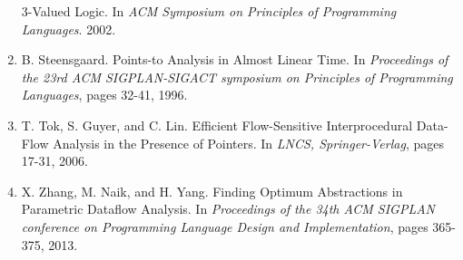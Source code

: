 \documentclass{article}
\begin{document}
\begin{enumerate}[1.]
        3-Valued Logic. In \textit{ACM Symposium on Principles of
        Programming Languages}. 2002.
    \item B. Steensgaard. Points-to Analysis in Almost Linear Time. In
        \textit{Proceedings of the 23rd ACM SIGPLAN-SIGACT symposium on
        Principles of Programming Languages}, pages 32-41, 1996.
    \item T. Tok, S. Guyer, and C. Lin. Efficient Flow-Sensitive
        Interprocedural Data-Flow Analysis in the Presence of Pointers. In
        \textit{LNCS, Springer-Verlag}, pages 17-31, 2006.
    \item X. Zhang, M. Naik, and H. Yang. Finding Optimum Abstractions in
        Parametric Dataflow Analysis. In \textit{Proceedings of the 34th ACM
        SIGPLAN conference on Programming Language Design and
        Implementation}, pages 365-375, 2013.
\end{enumerate}
\end{document}
